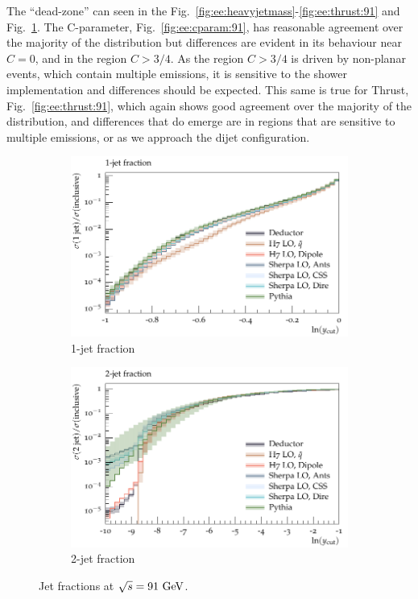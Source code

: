 The \Herwig \QTilde ``dead-zone'' can seen in the Fig.~\ref{fig:ee:heavyjetmass}-\ref{fig:ee:thrust:91} and Fig.~\ref{fig:ee:r1:91}.
The C-parameter, Fig.~\ref{fig:ee:cparam:91}, has reasonable agreement over the majority of the distribution but differences are evident in its behaviour near $C=0$, and in the region $C>3/4$. As the region $C>3/4$ is driven by non-planar events, which contain multiple emissions, it is sensitive to the shower implementation and differences should be expected. 
This same is true for Thrust, Fig.~\ref{fig:ee:thrust:91}, which again shows good agreement over the majority of the distribution, and differences that do emerge are in regions that are sensitive to multiple emissions, or as we approach the dijet configuration.
\begin{figure}[h]
  \centering
  \begin{subfigure}[t]{0.49\textwidth}
    \includegraphics[width=1\textwidth]{plots/EE-91-MuShower/MC_EETOJETS/R1.pdf}
    \caption{1-jet fraction}
    \label{fig:ee:r1:91}
  \end{subfigure}
  \begin{subfigure}[t]{0.49\textwidth}
    \includegraphics[width=1\textwidth]{plots/EE-91-MuShower/MC_EETOJETS/R2.pdf}
    \caption{2-jet fraction}
    \label{fig:ee:r2:91}
  \end{subfigure}
  \caption{Jet fractions at $\sqrt{s}=91~\textrm{GeV}$.}
  \label{fig:ee:r:91}
\end{figure}
